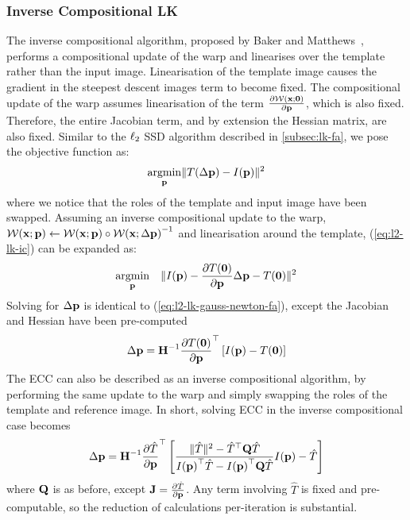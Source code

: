 \subsubsection{Inverse Compositional LK}\label{subsubsec:lk-ic}
The inverse compositional algorithm, proposed by Baker and
Matthews~\cite{RefWorks:74}, performs a compositional update of the warp and
linearises over the template rather than the input image. Linearisation of the
template image causes the gradient in the steepest descent images term to become
fixed. The compositional update of the warp assumes linearisation of the term
$\frac{\partial \mathcal{W}(\boldsymbol{\mathbf{x}};\boldsymbol{\mathbf{0}})}{\partial \boldsymbol{\mathbf{p}}}$, which is also
fixed. Therefore, the entire Jacobian term, and by extension the Hessian matrix,
are also fixed. Similar to the $\ell_2$ SSD algorithm described in
\cref{subsec:lk-fa}, we pose the objective function as:
\begin{equation}\label{eq:l2-lk-ic}
    \argmin_{\p} \norm{T(\Delta \p) - I(\p)}^2
\end{equation}
where we notice that the roles of the template and input image have been
swapped. Assuming an inverse compositional update to the warp,
$\mathcal{W}(\boldsymbol{\mathbf{x}};\boldsymbol{\mathbf{p}}) \leftarrow \mathcal{W}(\boldsymbol{\mathbf{x}};\boldsymbol{\mathbf{p}}) \circ {\mathcal{W}(\boldsymbol{\mathbf{x}};\Delta \boldsymbol{\mathbf{p}})}^{-1}$
and linearisation around the template, (\ref{eq:l2-lk-ic}) can be expanded as:
\begin{equation}\label{eq:l2-lk-linearised-ic}
    \argmin_{\p} \quad \norm{I(\p) - \frac{\partial T(\zero)}{\partial \p} \Delta \p - T(\zero)}^2
\end{equation}
Solving for $\Delta \boldsymbol{\mathbf{p}}$ is identical to (\ref{eq:l2-lk-gauss-newton-fa}), except
the Jacobian and Hessian have been pre-computed
\begin{equation}\label{eq:l2-lk-gauss-newton-ic}
    \Delta \boldsymbol{\mathbf{p}} = \boldsymbol{\mathbf{H}}^{-1} \frac{\partial T(\boldsymbol{\mathbf{0}})}{\partial \boldsymbol{\mathbf{p}}}^{\top} \left[ I(\boldsymbol{\mathbf{p}}) - T(\boldsymbol{\mathbf{0}}) \right]
\end{equation}
The ECC can also be described as an inverse compositional algorithm, by
performing the same update to the warp and simply swapping the roles of the
template and reference image. In short, solving ECC in the inverse compositional
case becomes
\begin{equation}\label{eq:ecc-lk-gauss-newton-ic}
    \Delta \boldsymbol{\mathbf{p}} = \boldsymbol{\mathbf{H}}^{-1} \frac{\partial \hat{T}}{\partial \boldsymbol{\mathbf{p}}}^{\top} \left[ \frac{\lVert{} \hat{T} \rVert^2 - \hat{T}^{\top} \boldsymbol{\mathbf{Q}} \hat{T}}{{I(\boldsymbol{\mathbf{p}})}^{\top} \hat{T} - {I(\boldsymbol{\mathbf{p}})}^{\top} \boldsymbol{\mathbf{Q}} \hat{T}} I(\boldsymbol{\mathbf{p}}) - \hat{T} \right]
\end{equation}
where $\boldsymbol{\mathbf{Q}}$ is as before, except $\boldsymbol{\mathbf{J}} = \frac{\partial \hat{T}}{\partial \boldsymbol{\mathbf{p}}}$. 
Any term involving $\hat{T}$ is fixed and pre-computable, so the reduction of 
calculations per-iteration is substantial.

